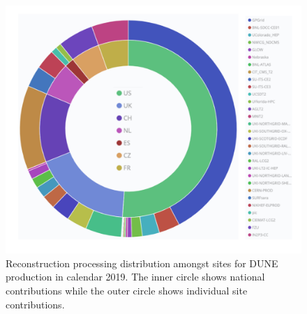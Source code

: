 \begin{figure}
\begin{center}
\includegraphics[height=0.65\textwidth]{graphics/IntroFigures/Fig_8.pdf}
\caption{Reconstruction processing distribution amongst sites for DUNE production in calendar 2019.  The inner circle shows national contributions while the outer circle shows individual site contributions.}
\label{sites}
\end{center}
\end{figure}

\subsection{}


